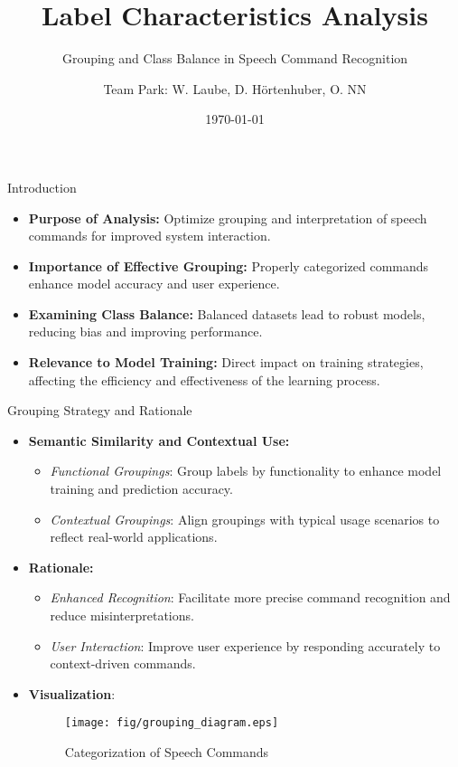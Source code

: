 \documentclass{beamer}
\title{Label Characteristics Analysis}
\subtitle{Grouping and Class Balance in Speech Command Recognition}
\author{Team Park: W. Laube, D. Hörtenhuber, O. NN}
\institute{JKU \\ MLPC}
\date{\today}
\begin{document}
\begin{frame}
  \titlepage
\end{frame}

\begin{frame}{Introduction}
  \begin{itemize}
    \item \textbf{Purpose of Analysis:} Optimize grouping and interpretation of speech commands for improved system interaction.
    \item \textbf{Importance of Effective Grouping:} Properly categorized commands enhance model accuracy and user experience.
    \item \textbf{Examining Class Balance:} Balanced datasets lead to robust models, reducing bias and improving performance.
    \item \textbf{Relevance to Model Training:} Direct impact on training strategies, affecting the efficiency and effectiveness of the learning process.
  \end{itemize}
\end{frame}

\begin{frame}{Grouping Strategy and Rationale}
  \begin{itemize}
    \item \textbf{Semantic Similarity and Contextual Use:}
      \begin{itemize}
        \item \textit{Functional Groupings}: Group labels by functionality to enhance model training and prediction accuracy.
        \item \textit{Contextual Groupings}: Align groupings with typical usage scenarios to reflect real-world applications.
      \end{itemize}
    \item \textbf{Rationale:}
      \begin{itemize}
        \item \textit{Enhanced Recognition}: Facilitate more precise command recognition and reduce misinterpretations.
        \item \textit{User Interaction}: Improve user experience by responding accurately to context-driven commands.
      \end{itemize}
    \item \textbf{Visualization}:
      \begin{figure}
        \centering
        \texttt{[image: fig/grouping\_diagram.eps]} %
        \caption{Categorization of Speech Commands}
        \label{fig:grouping}
      \end{figure}
  \end{itemize}
\end{frame}
\end{document}
